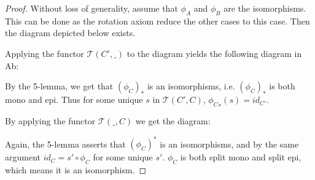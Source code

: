     \begin{proof}
        Without loss of generality, assume that $\phi_A$ and $\phi_B$ are the isomorphisms. This can be done as the rotation axiom reduce the other cases to this case. Then the diagram depicted below exists.
        \begin{center}
        \end{center}
        Applying the functor $\mathcal{T}(C',\_)$ to the diagram yields the following diagram in Ab:
        \begin{center}
        \end{center}
        By the 5-lemma, we get that $(\phi_C)_*$ is an isomorphisms, i.e. $(\phi_C)_*$ is both mono and epi. Thus for some unique $s$ in $\mathcal{T}(C',C)$, ${\phi_C}_*(s)=id_{C'}$. 

        By applying the functor $\mathcal{T}(\_,C)$ we get the diagram:
        \begin{center}
        \end{center}
        Again, the 5-lemma asserts that $(\phi_C)^*$ is an isomorphisms, and by the same argument $id_{C} = s'\circ\phi_C$ for some unique $s'$. $\phi_C$ is both split mono and split epi, which means it is an isomorphism.
    \end{proof}


